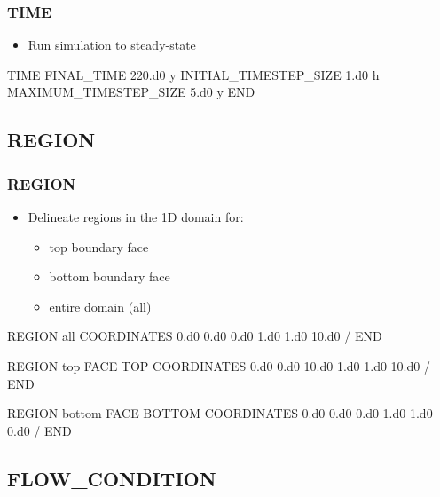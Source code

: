 \documentclass{beamer}
\begin{document}
\begin{frame}[fragile]\frametitle{TIME}

\begin{itemize}
\item Run simulation to steady-state
\end{itemize}

\begin{semiverbatim}

TIME
  FINAL_TIME 220.d0 y
  INITIAL_TIMESTEP_SIZE 1.d0 h
  MAXIMUM_TIMESTEP_SIZE 5.d0 y
END

\end{semiverbatim}

\end{frame}

\subsection{REGION}

\begin{frame}\frametitle{REGION}

\begin{itemize}
  \item Delineate regions in the 1D domain for:
  \begin{itemize}
    \item top boundary face
    \item bottom boundary face
    \item entire domain (all)
  \end{itemize}
\end{itemize}

\begin{semiverbatim}
REGION all
  COORDINATES
    0.d0 0.d0 0.d0
    1.d0 1.d0 10.d0
  /
END

\newpage
REGION top
  FACE TOP
  COORDINATES
    0.d0 0.d0 10.d0
    1.d0 1.d0 10.d0
  /
END

REGION bottom
  FACE BOTTOM
  COORDINATES
    0.d0 0.d0 0.d0
    1.d0 1.d0 0.d0
  /
END
\end{semiverbatim}

\end{frame}

\subsection{FLOW\_CONDITION}
\end{document}
